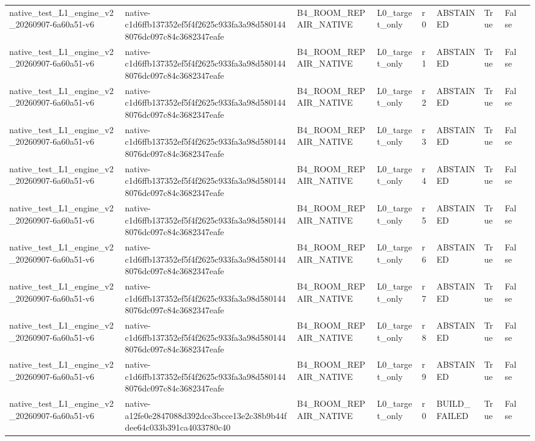 \begin{tabular}{lllllllll}
native\_test\_L1\_engine\_v2\_20260907-6a60a51-v6 & native-c1d6ffb137352ef5f4f2625c933fa3a98d5801448076dc097c84c3682347eafe & B4\_ROOM\_REPAIR\_NATIVE & L0\_target\_only & r0 & ABSTAINED & True & False &  \\
native\_test\_L1\_engine\_v2\_20260907-6a60a51-v6 & native-c1d6ffb137352ef5f4f2625c933fa3a98d5801448076dc097c84c3682347eafe & B4\_ROOM\_REPAIR\_NATIVE & L0\_target\_only & r1 & ABSTAINED & True & False &  \\
native\_test\_L1\_engine\_v2\_20260907-6a60a51-v6 & native-c1d6ffb137352ef5f4f2625c933fa3a98d5801448076dc097c84c3682347eafe & B4\_ROOM\_REPAIR\_NATIVE & L0\_target\_only & r2 & ABSTAINED & True & False &  \\
native\_test\_L1\_engine\_v2\_20260907-6a60a51-v6 & native-c1d6ffb137352ef5f4f2625c933fa3a98d5801448076dc097c84c3682347eafe & B4\_ROOM\_REPAIR\_NATIVE & L0\_target\_only & r3 & ABSTAINED & True & False &  \\
native\_test\_L1\_engine\_v2\_20260907-6a60a51-v6 & native-c1d6ffb137352ef5f4f2625c933fa3a98d5801448076dc097c84c3682347eafe & B4\_ROOM\_REPAIR\_NATIVE & L0\_target\_only & r4 & ABSTAINED & True & False &  \\
native\_test\_L1\_engine\_v2\_20260907-6a60a51-v6 & native-c1d6ffb137352ef5f4f2625c933fa3a98d5801448076dc097c84c3682347eafe & B4\_ROOM\_REPAIR\_NATIVE & L0\_target\_only & r5 & ABSTAINED & True & False &  \\
native\_test\_L1\_engine\_v2\_20260907-6a60a51-v6 & native-c1d6ffb137352ef5f4f2625c933fa3a98d5801448076dc097c84c3682347eafe & B4\_ROOM\_REPAIR\_NATIVE & L0\_target\_only & r6 & ABSTAINED & True & False &  \\
native\_test\_L1\_engine\_v2\_20260907-6a60a51-v6 & native-c1d6ffb137352ef5f4f2625c933fa3a98d5801448076dc097c84c3682347eafe & B4\_ROOM\_REPAIR\_NATIVE & L0\_target\_only & r7 & ABSTAINED & True & False &  \\
native\_test\_L1\_engine\_v2\_20260907-6a60a51-v6 & native-c1d6ffb137352ef5f4f2625c933fa3a98d5801448076dc097c84c3682347eafe & B4\_ROOM\_REPAIR\_NATIVE & L0\_target\_only & r8 & ABSTAINED & True & False &  \\
native\_test\_L1\_engine\_v2\_20260907-6a60a51-v6 & native-c1d6ffb137352ef5f4f2625c933fa3a98d5801448076dc097c84c3682347eafe & B4\_ROOM\_REPAIR\_NATIVE & L0\_target\_only & r9 & ABSTAINED & True & False &  \\
native\_test\_L1\_engine\_v2\_20260907-6a60a51-v6 & native-a12fe0e2847088d392dce3bcce13e2c38b9b44fdee64c033b391ca4033780c40 & B4\_ROOM\_REPAIR\_NATIVE & L0\_target\_only & r0 & BUILD\_FAILED & True & False &  \\

\end{tabular}
